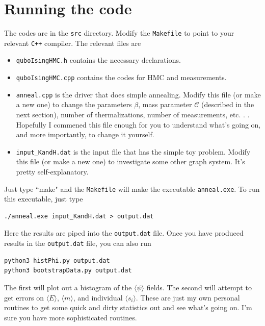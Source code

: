 \documentclass[11pt]{article}
\begin{document}
\section{Running the code}
The codes are in the \texttt{src} directory.  Modify the \texttt{Makefile} to point to your relevant \texttt{C++} compiler.  The relevant files are 
\begin{itemize}
\item \texttt{quboIsingHMC.h} contains the necessary declarations.
\item \texttt{quboIsingHMC.cpp} contains the codes for HMC and measurements.
\item \texttt{anneal.cpp} is the driver that does simple annealing.  Modify this file (or make a new one) to change the parameters $\beta$, mass parameter $\mathcal{C}$ (described in the next section), number of thermalizations, number of measurements, etc. . .  Hopefully I commened this file enough for you to understand what's going on, and more importantly, to change it yourself.
\item \texttt{input\_KandH.dat} is the input file that has the simple toy problem.  Modify this file (or make a new one) to investigate some other graph system.  It's pretty self-explanatory.
\end{itemize}
Just type ``make" and the \texttt{Makefile} will make the executable \texttt{anneal.exe}.  To run this executable, just type
\begin{lstlisting}
./anneal.exe input_KandH.dat > output.dat
\end{lstlisting}
Here the results are piped into the \texttt{output.dat} file.  Once you have produced results in the \texttt{output.dat} file, you can also run
\begin{lstlisting}
python3 histPhi.py output.dat
python3 bootstrapData.py output.dat
\end{lstlisting}
The first will plot out a histogram of the $\langle\psi\rangle$ fields.  The second will attempt to get errors on $\langle E\rangle$, $\langle m\rangle$, and individual $\langle s_i\rangle$.  These are just my own personal routines to get some quick and dirty statistics out and see what's going on.  I'm sure you have more sophisticated routines.
\end{document}
